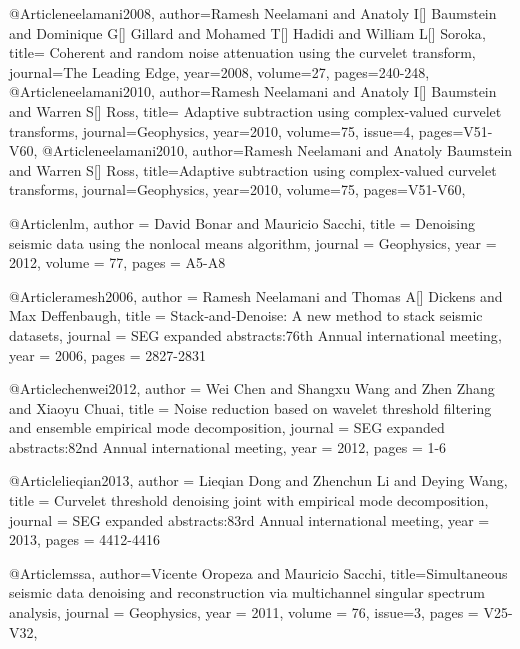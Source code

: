 {@Article{neelamani2008,
  author={Ramesh Neelamani and Anatoly I[] Baumstein and Dominique G[] Gillard and Mohamed T[] Hadidi and William L[] Soroka},
  title={	
Coherent and random noise attenuation using the curvelet transform},
  journal={The Leading Edge},
  year=2008,
  volume=27,
  pages={240-248},
}
@Article{neelamani2010,
  author={Ramesh Neelamani and Anatoly I[] Baumstein and Warren S[] Ross},
  title={		
Adaptive subtraction using complex-valued curvelet transforms},
  journal={Geophysics},
  year=2010,
  volume=75,
  issue=4,
  pages={V51-V60},
}
@Article{neelamani2010,
  author={Ramesh Neelamani and Anatoly Baumstein and Warren S[] Ross},
  title={Adaptive subtraction using complex-valued curvelet transforms},
  journal={Geophysics},
  year=2010,
  volume=75,
  pages={V51-V60},
}


@Article{nlm,
  author = 	 {David Bonar and Mauricio Sacchi},
  title = 	 {Denoising seismic data using the nonlocal means algorithm},
  journal = 	 {Geophysics},
  year = 	 2012,
  volume =	 77,
  pages =	 {A5-A8}
}

@Article{ramesh2006,
  author = 	 {Ramesh Neelamani and Thomas A[] Dickens and Max Deffenbaugh},
  title = 	 {	
Stack‐and‐Denoise: A new method to stack seismic datasets},
  journal = 	 {SEG expanded abstracts:76th Annual international meeting},
  year = 	 2006,
  pages =	 {2827-2831}
}

@Article{chenwei2012,
  author = 	 {Wei Chen and Shangxu Wang and Zhen Zhang and Xiaoyu Chuai},
  title = 	 {Noise reduction based on wavelet threshold filtering and ensemble empirical mode decomposition},
  journal = 	 {SEG expanded abstracts:82nd Annual international meeting},
  year = 	 2012,
  pages =	 {1-6}
}

@Article{lieqian2013,
  author = 	 {Lieqian Dong and Zhenchun Li and Deying Wang},
  title = 	 {Curvelet threshold denoising joint with empirical mode decomposition},
  journal = 	 {SEG expanded abstracts:83rd Annual international meeting},
  year = 	 2013,
  pages =	 {4412-4416}
}



@Article{mssa,
  author={Vicente Oropeza and Mauricio Sacchi},
  title={Simultaneous seismic data denoising and reconstruction via multichannel singular spectrum analysis},
  journal = 	 {Geophysics},
  year = 	 2011,
  volume =	 76,
    issue=3,
  pages =	 {V25-V32},
}

}
